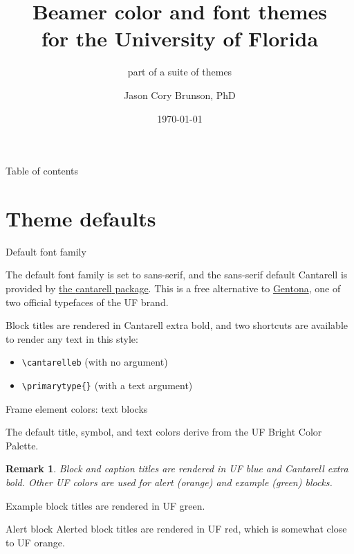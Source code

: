\documentclass{beamer}
\title[Beamer colors and fonts for UF]{Beamer color and font themes\\ for the University of Florida}
\subtitle{part of a suite of themes}
\author[Cory Brunson]{Jason Cory Brunson, PhD}
\institute[University of Florida]{Laboratory for Systems Medicine\\ Division of Pulmonary, Critical Care, and Sleep Medicine\\ University of Florida}
\date{\today}
\newtheorem{remark}{Remark}
\begin{document}
\begin{frame}
\titlepage
\end{frame}


\begin{frame}{Table of contents}
\tableofcontents
\end{frame}


\section{Theme defaults}


\begin{frame}[fragile]{Default font family}


The default font family is set to sans-serif, and the sans-serif default Cantarell is provided by \href{https://www.ctan.org/tex-archive/fonts/cantarell}{the {\ttfamily cantarell} package}. This is a free alternative to \href{http://identity.ufl.edu/typography/}{Gentona}, one of two official typefaces of the UF brand.

Block titles are rendered in {\cantarelleb Cantarell extra bold}, and two shortcuts are available to render any text in this style:
\begin{itemize}
\item \verb|\cantarelleb| (with no argument)
\item \verb|\primarytype{}| (with a text argument)
\end{itemize}

\end{frame}


\begin{frame}{Frame element colors: text blocks}

The default title, symbol, and text colors derive from the UF Bright Color Palette.

\begin{remark}
Block and caption titles are rendered in UF blue and Cantarell extra bold.
Other UF colors are used for alert (orange) and example (green) blocks.
\end{remark}

\begin{example}
Example block titles are rendered in UF green.
\end{example}

\begin{alertblock}{Alert block}
Alerted block titles are rendered in UF red, which is somewhat close to UF orange.
\end{alertblock}

\end{frame}
\end{document}
